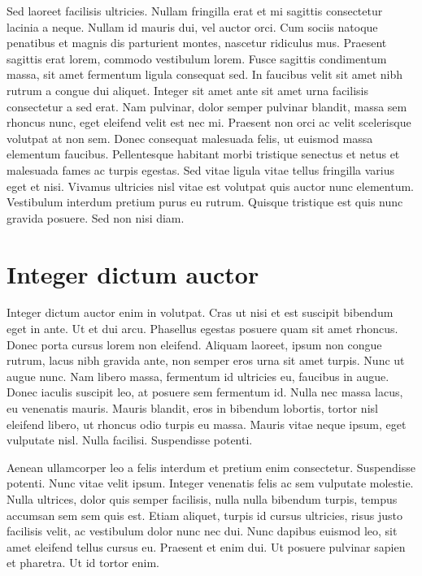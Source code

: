 Sed laoreet facilisis ultricies.
Nullam fringilla erat et mi sagittis consectetur lacinia a neque.
Nullam id mauris dui, vel auctor orci.
Cum sociis natoque penatibus et magnis dis parturient montes, nascetur ridiculus mus.
Praesent sagittis erat lorem, commodo vestibulum lorem.
Fusce sagittis condimentum massa, sit amet fermentum ligula consequat sed.
In faucibus velit sit amet nibh rutrum a congue dui aliquet.
Integer sit amet ante sit amet urna facilisis consectetur a sed erat.
Nam pulvinar, dolor semper pulvinar blandit, massa sem rhoncus nunc, eget eleifend velit est nec mi.
Praesent non orci ac velit scelerisque volutpat at non sem.
Donec consequat malesuada felis, ut euismod massa elementum faucibus.
Pellentesque habitant morbi tristique senectus et netus et malesuada fames ac turpis egestas.
Sed vitae ligula vitae tellus fringilla varius eget et nisi.
Vivamus ultricies nisl vitae est volutpat quis auctor nunc elementum.
Vestibulum interdum pretium purus eu rutrum.
Quisque tristique est quis nunc gravida posuere.
Sed non nisi diam.

\section{Integer dictum auctor}
Integer dictum auctor enim in volutpat.
Cras ut nisi et est suscipit bibendum eget in ante.
Ut et dui arcu.
Phasellus egestas posuere quam sit amet rhoncus.
Donec porta cursus lorem non eleifend.
Aliquam laoreet, ipsum non congue rutrum, lacus nibh gravida ante, non semper eros urna sit amet turpis.
Nunc ut augue nunc.
Nam libero massa, fermentum id ultricies eu, faucibus in augue.
Donec iaculis suscipit leo, at posuere sem fermentum id.
Nulla nec massa lacus, eu venenatis mauris.
Mauris blandit, eros in bibendum lobortis, tortor nisl eleifend libero, ut rhoncus odio turpis eu massa.
Mauris vitae neque ipsum, eget vulputate nisl.
Nulla facilisi.
Suspendisse potenti.

Aenean ullamcorper leo a felis interdum et pretium enim consectetur.
Suspendisse potenti.
Nunc vitae velit ipsum.
Integer venenatis felis ac sem vulputate molestie.
Nulla ultrices, dolor quis semper facilisis, nulla nulla bibendum turpis, tempus accumsan sem sem quis est.
Etiam aliquet, turpis id cursus ultricies, risus justo facilisis velit, ac vestibulum dolor nunc nec dui.
Nunc dapibus euismod leo, sit amet eleifend tellus cursus eu.
Praesent et enim dui.
Ut posuere pulvinar sapien et pharetra.
Ut id tortor enim.

